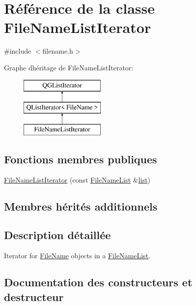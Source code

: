 \hypertarget{class_file_name_list_iterator}{}\section{Référence de la classe File\+Name\+List\+Iterator}
\label{class_file_name_list_iterator}


{\ttfamily \#include $<$filename.\+h$>$}

Graphe d\textquotesingle{}héritage de File\+Name\+List\+Iterator\+:\begin{figure}[H]
\begin{center}
\leavevmode
\includegraphics[height=3.000000cm]{class_file_name_list_iterator}
\end{center}
\end{figure}
\subsection*{Fonctions membres publiques}
\begin{DoxyCompactItemize}
\item 
\hyperlink{class_file_name_list_iterator_a3671d429b0fc2b8501c3a294f328fba5}{File\+Name\+List\+Iterator} (const \hyperlink{class_file_name_list}{File\+Name\+List} \&\hyperlink{class_q_g_list_iterator_a6e606950ab50b273e8370d9e24756bf2}{list})
\end{DoxyCompactItemize}
\subsection*{Membres hérités additionnels}


\subsection{Description détaillée}
Iterator for \hyperlink{class_file_name}{File\+Name} objects in a \hyperlink{class_file_name_list}{File\+Name\+List}. 

\subsection{Documentation des constructeurs et destructeur}
\hypertarget{class_file_name_list_iterator_a3671d429b0fc2b8501c3a294f328fba5}{}

